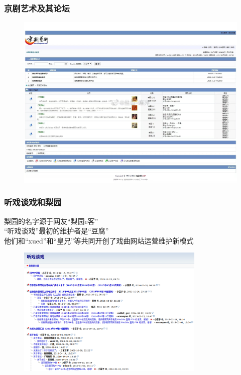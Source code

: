 \documentclass[cjk,slidestop,compress,mathserif,blue]{beamer}
\begin{document}
\frame
{
	\frametitle{京剧艺术及其论坛}
\begin{figure}[h!]
\centering
\vspace{-0.3in}
\includegraphics[height=0.75\textwidth,width=1.05\textwidth,clip]{Figures_Peking-Opera/PekOpe_Jingyilun.jpg}
\label{Jingyi-2}
\end{figure}
}

\frame
{
	\frametitle{听戏谈戏和梨园}
	梨园的名字源于网友“梨园\textrm{e}客”\\“听戏谈戏”最初的维护者是“豆腐”\\
	他们和“\textrm{xued}”和“皇兄”等共同开创了戏曲网站运营维护新模式
\begin{figure}[h!]
\centering
\includegraphics[height=0.55\textwidth,width=0.80\textwidth,clip]{Figures_Peking-Opera/PekOpe_Talk.png}
\label{Talk}
\end{figure}
}
\end{document}
